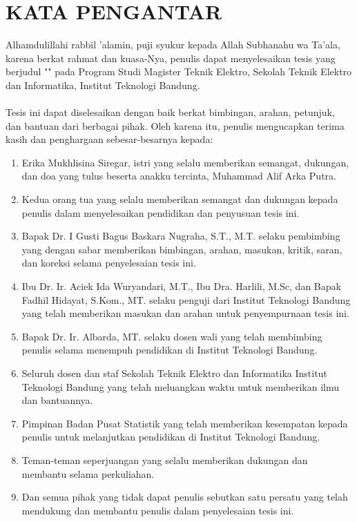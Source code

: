 \chapter*{KATA PENGANTAR}

\noindent Alhamdulillahi rabbil 'alamin, puji syukur kepada Allah Subhanahu wa Ta'ala, karena berkat rahmat dan kuasa-Nya, penulis dapat menyelesaikan tesis yang berjudul "\judul" pada Program Studi Magister Teknik Elektro, Sekolah Teknik Elektro dan Informatika, Institut Teknologi Bandung.\\
\\
\noindent Tesis ini dapat diselesaikan dengan baik berkat bimbingan, arahan, petunjuk, dan bantuan dari berbagai pihak. Oleh karena itu, penulis mengucapkan terima kasih dan penghargaan sebesar-besarnya kepada:

\begin{enumerate}
	\item Erika Mukhlisina Siregar, istri yang selalu memberikan semangat, dukungan, dan doa yang tulus beserta anakku tercinta, Muhammad Alif Arka Putra.
	\item Kedua orang tua yang selalu memberikan semangat dan dukungan kepada penulis dalam menyelesaikan pendidikan dan penyusuan tesis ini.
	\item Bapak Dr. I Gusti Bagus Baskara Nugraha, S.T., M.T. selaku pembimbing yang dengan sabar memberikan bimbingan, arahan, masukan, kritik, saran, dan koreksi selama penyelesaian tesis ini.
	\item Ibu Dr. Ir. Aciek Ida Wuryandari, M.T., Ibu Dra. Harlili, M.Sc, dan Bapak Fadhil Hidayat, S.Kom., MT. selaku penguji dari Institut Teknologi Bandung yang telah memberikan masukan dan arahan untuk penyempurnaan tesis ini.
	\item Bapak Dr. Ir. Albarda, MT. selaku dosen wali yang telah membimbing penulis selama menempuh pendidikan di Institut Teknologi Bandung.
	\item Seluruh dosen dan staf Sekolah Teknik Elektro dan Informatika Institut Teknologi Bandung yang telah meluangkan waktu untuk memberikan ilmu dan bantuannya.
	\item Pimpinan Badan Pusat Statistik yang telah memberikan kesempatan kepada penulis untuk melanjutkan pendidikan di Institut Teknologi Bandung.
	\item Teman-teman seperjuangan yang selalu memberikan dukungan dan membantu selama perkuliahan.
	\item Dan semua pihak yang tidak dapat penulis sebutkan satu persatu yang telah mendukung dan membantu penulis dalam penyelesaian tesis ini.
\end{enumerate}

